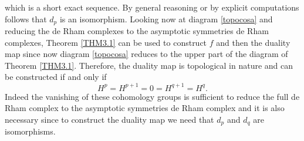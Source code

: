 \documentclass[a4paper,12pt]{article}
\begin{document}
which is a short exact sequence. By general reasoning or by explicit computations follows that $d_p$ is an isomorphism. Looking now at diagram \eqref{topocosa} and reducing the de Rham complexes to the asymptotic symmetries de Rham complexes, Theorem \eqref{THM3.1} can be used to construct $f$ and then the duality map since now diagram \eqref{topocosa} reduces to the upper part of the diagram of Theorem \eqref{THM3.1}. Therefore, the duality map is topological in nature and can be constructed if and only if 
\begin{equation}
    H^p=H^{p+1}=0=H^{q+1}=H^{q}.
    \label{cohom}
\end{equation}
Indeed the vanishing of these cohomology groups is sufficient to reduce the full de Rham complex to the asymptotic symmetries de Rham complex and it is also necessary since to construct the duality map we need that $d_p$ and $d_q$ are isomorphisms.
\end{document}

